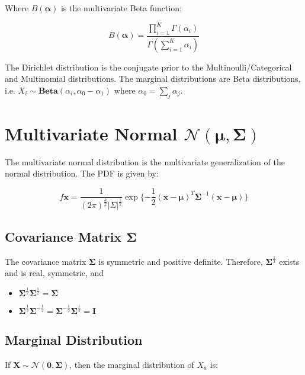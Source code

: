 Where $B(\mathbf{\alpha})$ is the multivariate Beta function:

\begin{equation}
B(\mathbf{\alpha}) = \frac{\prod^K_{i=1}\Gamma(\alpha_i)}{\Gamma(\sum_{i=1}^K\alpha_i)}
\end{equation}

The Dirichlet distribution is the conjugate prior to the Multinoulli/Categorical and Multinomial distributions. The marginal distributions are Beta distributions, i.e. $X_i \sim \mathbf{Beta}(\alpha_i,\alpha_0-\alpha_1)$ where $\alpha_0 = \sum_j \alpha_j$.



\section{Multivariate Normal $\mathscr{N}(\mathbf{\mu},\mathbf{\Sigma})$}
The multivariate normal distribution is the multivariate generalization of the normal distribution. The PDF is given by:

\begin{equation}
f{\mathbf{x}} = \frac{1}{(2\pi)^{\frac{k}{2}}|\Sigma|^{\frac{1}{2}}}\exp\{-\frac{1}{2}(\mathbf{x}-\mathbf{\mu})^T \mathbf{\Sigma}^{-1}(\mathbf{x}-\mathbf{\mu})\}
\end{equation}



\subsection{Covariance Matrix $\mathbf{\Sigma}$}
The covariance matrix $\mathbf{\Sigma}$ is symmetric and positive definite. Therefore, $\mathbf{\Sigma}^{\frac{1}{2}}$ exists and is real, symmetric, and

\begin{itemize}
\item $\mathbf{\Sigma}^{\frac{1}{2}}\mathbf{\Sigma}^{\frac{1}{2}} = \mathbf{\Sigma}$
\item $\mathbf{\Sigma}^{\frac{1}{2}}\mathbf{\Sigma}^{-\frac{1}{2}}=\mathbf{\Sigma}^{-\frac{1}{2}}\mathbf{\Sigma}^{\frac{1}{2}}=\mathbf{I}$
\end{itemize}


\subsection{Marginal Distribution}
If $\mathbf{X} \sim \mathscr{N}(\mathbf{0},\mathbf{\Sigma})$, then the marginal distribution of $X_a$ is:

